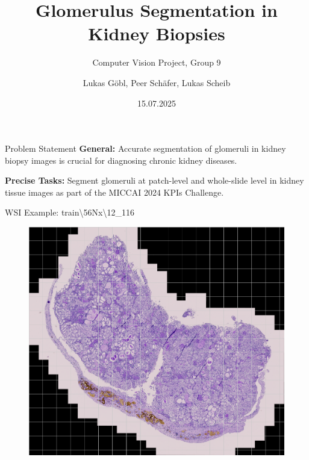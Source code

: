 \documentclass{beamer}
\title[Glom Segmentation]{Glomerulus Segmentation in Kidney Biopsies}
\subtitle{Computer Vision Project, Group 9}
\author[Group 9]{Lukas Göbl, Peer Schäfer, Lukas Scheib}
\date{15.07.2025}
\begin{document}
\begin{frame}
    \titlepage
\end{frame}

\begin{frame}{Problem Statement}
    \textbf{General:} Accurate segmentation of glomeruli in kidney biopsy images is crucial for diagnosing chronic kidney diseases.

    \vspace{0.5cm}

    \textbf{Precise Tasks:} Segment glomeruli at patch-level and whole-slide level in kidney tissue images as part of the MICCAI 2024 KPIs Challenge.
\end{frame}

\begin{frame}{WSI Example: train\textbackslash56Nx\textbackslash12\_116}
    \begin{figure}
        \vspace{-0.14cm}
        \centering
        \includegraphics[height=0.877\textheight]{Images/wsi_thumbnail_with_grid.png}
    \end{figure}
\end{frame}
\end{document}

